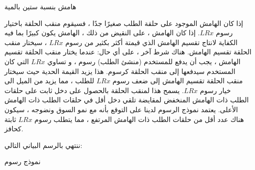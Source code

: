 \documentclass[12pt, a4paper, leqno]{report}
\makeatletter
\newenvironment{figurehere}
 {\def\@captype{figure}}
 {}
\theoremstyle{plain}
\theoremstyle{definition}
\makeatother
\begin{document}
\begin{multicols}{2}
\begin{otherlanguage}{arabic}
\begin{center}
\begin{figurehere}
\caption{هامش بنسبة ستين بالمية}
\label{fig:marginsplit}
\end{figurehere}
\end{center}

إذا كان الهامش الموجود على حلقة الطلب صغيرًا جدًا ، فسيقوم منقب الحلقة باختيار رسوم $LRx$. إذا كان الهامش ، على النقيض من ذلك ، الهامش يكون كبيرًا بما فيه الكفاية لانتاج تقسيم الهامش الذي قيمتة أكثر بكثير من رسوم $LRx$ ، سيختار منقب الحلقة تقسيم الهامش. هناك شرط آخر ، على أي حال: عندما يختار منقب الحلقة  تقسيم الهامش ، يجب أن يدفع للمستخدم (منشئ الطلب) رسوم ، و تساوي $LRx$ التي كان المستخدم سيدفعها إلى منقب الحلقة  كرسوم. هذا يزيد القيمة الحدية حيث سيختار منقب الحلقة تقسيم الهامش إلى ضعف رسوم $LRx$ للطلب ، مما يزيد من الميل الى خيار رسوم $LRx$. يسمح هذا لمنقب الحلقة بالحصول على دخل ثابت على حلقات الطلب ذات الهامش المنخفض لمقايضة تلقي دخل أقل في حلقات الطلب ذات الهامش الأعلى. يعتمد نموذج الرسوم لدينا على التوقع بأنه مع نمو السوق ونضوجه ، سيكون هناك عدد أقل من حلقات الطلب ذات الهامش المرتفع ، مما يتطلب رسوم $LRx$ ثابتة كحافز.

ننتهي بالرسم البياني التالي:

\begin{center}
\begin{figurehere}
\centering
{}
\caption{نموذج رسوم }
\label{fig:feemodel}
\end{figurehere}
\end{center}


\end{otherlanguage}
\end{multicols}
\end{document}
